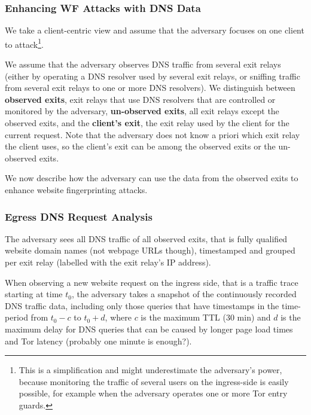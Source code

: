 \subsubsection{Enhancing WF Attacks with DNS Data}

We take a client-centric view and assume that the adversary focuses on
one client to attack\footnote{This is a simplification and might underestimate
the adversary's power, because monitoring the traffic of several users
on the ingress-side is easily possible, for example when the adversary
operates one or more Tor entry guards.}.

We assume that the adversary observes DNS traffic from several exit
relays (either by operating a DNS resolver used by several exit relays,
or sniffing traffic from several exit relays to one or more DNS
resolvers).
%
We distinguish between \textbf{observed exits}, \ie exit relays that use
DNS resolvers that are controlled or monitored by the adversary,
\textbf{un-observed exits}, \ie all exit relays except the observed
exits, and the \textbf{client's exit}, \ie the exit relay used by the
client for the current request.
%
Note that the adversary does not know a priori which exit relay the
client uses, so the client's exit can be among the observed exits or the
un-observed exits.

%
We now describe how the adversary can use the data from the observed
exits to enhance website fingerprinting attacks.


\subsubsection{Egress DNS Request Analysis}

The adversary sees all DNS traffic of all observed exits, that is fully
qualified website domain names (not webpage URLs though), timestamped
and grouped per exit relay (\eg labelled with the exit relay's IP
address).

When observing a new website request on the ingress side, that is a
traffic trace starting at time $t_0$, the adversary takes a snapshot
of the continuously recorded DNS traffic data, including only those queries
that have timestamps in the time-period from $t_0 - c$ to $t_0 + d$,
where $c$ is the maximum TTL (30 min) and $d$ is the maximum delay
for DNS queries that can be caused by longer page load times and Tor
latency (probably one minute is enough?).


